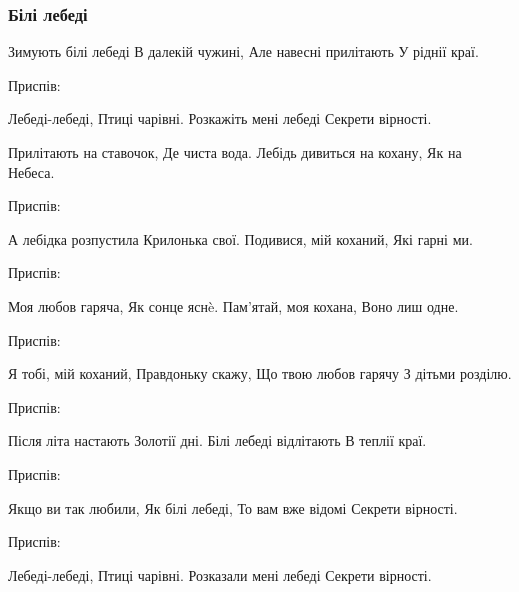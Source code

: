  
 
 

\subsubsection{Білі лебеді}
\label{sec:poetry.rus.anastasia_lagan_1954.bili_lebedi}

Зимують білі лебеді
В далекій чужині,
Але навесні прилітають
У ріднії краї.

Приспів:

Лебеді-лебеді,
Птиці чарівні.
Розкажіть мені лебеді
Секрети вірності.

Прилітають на ставочок,
Де чиста вода.
Лебідь дивиться на кохану,
Як на Небеса.

Приспів:

А лебідка розпустила
Крилонька свої.
Подивися, мій коханий,
Які гарні ми.

Приспів:

Моя любов гаряча,
Як сонце яснè.
Пам’ятай, моя кохана,
Воно лиш одне.

Приспів:

Я тобі, мій коханий,
Правдоньку скажу,
Що твою любов гарячу
З дітьми розділю.

Приспів:

Після літа настають
Золотії дні.
Білі лебеді відлітають
В теплії краї.

Приспів:

Якщо ви так любили,
Як білі лебеді,
То вам вже відомі
Секрети вірності.

Приспів:

Лебеді-лебеді,
Птиці чарівні.
Розказали мені лебеді
Секрети вірності. 
